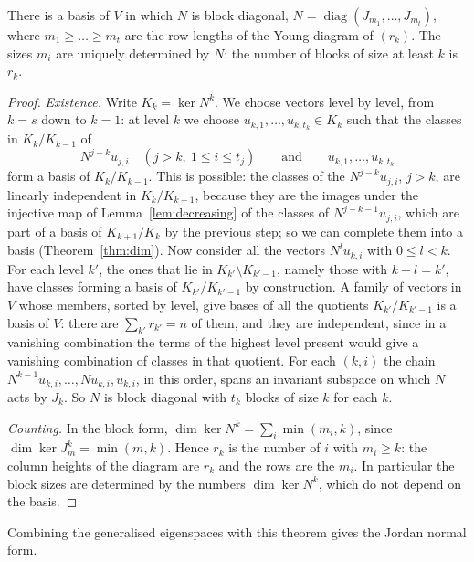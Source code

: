 \begin{theorem}\label{thm:jordannil}
There is a basis of $V$ in which $N$ is block diagonal, $N=\operatorname{diag}(J_{m_1},\dots,J_{m_t})$, where $m_1\ge\dots\ge
m_t$ are the row lengths of the Young diagram of $(r_k)$. The sizes $m_i$ are uniquely determined by $N$: the number of
blocks of size at least $k$ is $r_k$.
\end{theorem}
\begin{proof}
\emph{Existence.} Write $K_k=\ker N^k$. We choose vectors level by level, from $k=s$ down to $k=1$: at level $k$ we choose
$u_{k,1},\dots,u_{k,t_k}\in K_k$ such that the classes in $K_k/K_{k-1}$ of
\[
N^{j-k}u_{j,i}\quad(j>k,\ 1\le i\le t_j)\qquad\text{and}\qquad u_{k,1},\dots,u_{k,t_k}
\]
form a basis of $K_k/K_{k-1}$. This is possible: the classes of the $N^{j-k}u_{j,i}$, $j>k$, are linearly independent in
$K_k/K_{k-1}$, because they are the images under the injective map of Lemma~\ref{lem:decreasing} of the classes of
$N^{j-k-1}u_{j,i}$, which are part of a basis of $K_{k+1}/K_k$ by the previous step; so we can complete them into a basis
(Theorem~\ref{thm:dim}). Now consider all the vectors $N^lu_{k,i}$ with $0\le l<k$. For each level $k'$, the ones that lie in
$K_{k'}\setminus K_{k'-1}$, namely those with $k-l=k'$, have classes forming a basis of $K_{k'}/K_{k'-1}$ by construction.
A family of vectors in $V$ whose members, sorted by level, give bases of all the quotients $K_{k'}/K_{k'-1}$ is a basis of $V$:
there are $\sum_{k'}r_{k'}=n$ of them, and they are independent, since in a vanishing combination the terms of the highest
level present would give a vanishing combination of classes in that quotient. For each $(k,i)$ the chain
$N^{k-1}u_{k,i},\dots,Nu_{k,i},u_{k,i}$, in this order, spans an invariant subspace on which $N$ acts by $J_k$. So $N$ is block
diagonal with $t_k$ blocks of size $k$ for each $k$.

\emph{Counting.} In the block form, $\dim\ker N^k=\sum_i\min(m_i,k)$, since $\dim\ker J_m^k=\min(m,k)$. Hence $r_k$ is the
number of $i$ with $m_i\ge k$: the column heights of the diagram are $r_k$ and the rows are the $m_i$. In particular the
block sizes are determined by the numbers $\dim\ker N^k$, which do not depend on the basis.
\end{proof}

Combining the generalised eigenspaces with this theorem gives the Jordan normal form.

